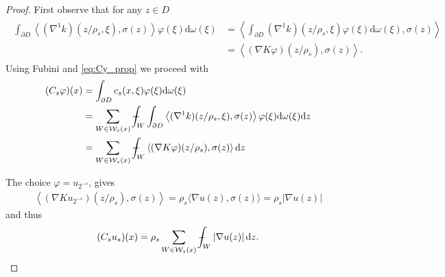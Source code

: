 \documentclass[a4paper,12pt]{article}
\theoremstyle{definition}
\theoremstyle{definition}
\def\Xint#1{\mathchoice
	{\XXint\displaystyle\textstyle{#1}}%
	{\XXint\textstyle\scriptstyle{#1}}%
	{\XXint\scriptstyle\scriptscriptstyle{#1}}%
	{\XXint\scriptscriptstyle\scriptscriptstyle{#1}}%
	\!\int}
\def\XXint#1#2#3{{\setbox0=\hbox{$#1{#2#3}{\int}$ }
		\vcenter{\hbox{$#2#3$ }}\kern-.568\wd0}}
\def\dashint{\Xint-}
\begin{document}
	\begin{proof}
		 First observe that for any $z\in D$
		\begin{align}
			\label{eq:Cy_prop}
			\begin{aligned}
				\int_{\partial D}\left\langle(\nabla^1k)(z/\rho_s,\xi),\sigma(z)\right\rangle\varphi(\xi)\mathrm{d}\omega(\xi)&=\left\langle\int_{\partial D}(\nabla^1 k)(z/\rho_s,\xi)\varphi(\xi)\mathrm{d}\omega(\xi) ,\sigma(z)\right\rangle\\
				&=\left\langle(\nabla K\varphi)(z/\rho_s) ,\sigma(z)\right\rangle.
			\end{aligned}
		\end{align}
		Using Fubini and \eqref{eq:Cy_prop} we proceed with
		\begin{align*}
			(C_s\varphi)(x)&=\int_{\partial D} c_s(x,\xi)\varphi(\xi)\mathrm{d}\omega(\xi)\\
			&=\sum_{W\in \mathcal W_s(x)}\dashint_{W}\int_{\partial D} \left\langle(\nabla^1k)(z/\rho_s,\xi),\sigma(z)\right\rangle\varphi(\xi)\mathrm{d}\omega(\xi)\mathrm{d}z\\
			&=\sum_{ W\in \mathcal W_s(x)}\dashint_{W}\left\langle(\nabla K\varphi)(z/\rho_s) ,\sigma(z)\right\rangle\mathrm{d}z
		\end{align*}
		
		The choice $\varphi= u_{2^{-s}}$, gives
		\begin{align*}
			\left\langle(\nabla K u_{2^{-s}})(z/\rho_s) ,\sigma(z)\right\rangle=\rho_s\langle\nabla u(z),\sigma(z)\rangle =\rho_s\left|\nabla u(z)\right|
		\end{align*}
		and thus
		\begin{align*}
			(C_s u_s)(x)=\rho_s\sum_{W\in\mathcal W_s(x)}\dashint_{W}\left|\nabla u(z)\right|\mathrm{d}z  .
		\end{align*}
	\end{proof}
	
\end{document}
